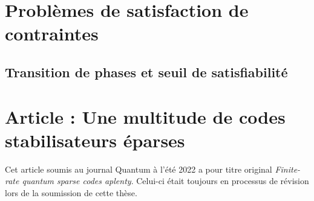\section{Problèmes de satisfaction de contraintes}
\subsection{Transition de phases et seuil de satisfiabilité}

\section{Article : Une multitude de codes stabilisateurs éparses}

Cet article soumis au journal Quantum à l'été 2022 a pour titre original
\textit{Finite-rate quantum sparse codes aplenty}.
Celui-ci était toujours en processus de révision lors de la soumission de cette thèse.


